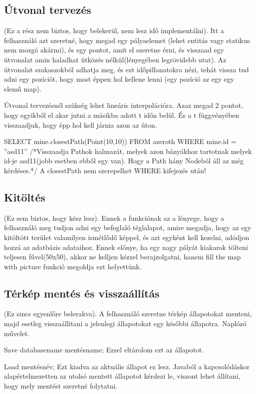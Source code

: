 \subsection{Útvonal tervezés}

(Ez a rész nem biztos, hogy belekerül, nem lesz idő implementálni). Itt a felhasználó azt szeretné, hogy megad egy pályaelemet (lehet entitás vagy statikus nem mozgó akármi), és egy pontot, amit el szeretne érni, és visszaad egy útvonalat amin haladhat ütközés nélkül(lényegében legrövidebb utat). Az útvonalat szakaszokból adhatja meg, és ezt időpillanatokra nézi, tehát vissza tud adni egy pozíciót, hogy most éppen hol kellene lenni (egy pozíció az egy egy elemű map).

Útvonal tervezésnél szükség lehet lineáris interpolációra. Azaz megad 2 pontot, hogy egyikből el akar jutni a másikba adott t időn belül. És a t függvényében visszaadjuk, hogy épp hol kell járnia azon az úton.

SELECT mine.closestPath(Point(10,10)) FROM azeroth WHERE mine.id = ”asd11”
/*Visszaadja Pathok halmazát, melyek azon bányákhoz tartotnak melyek id-je asd11(jobb esetben ebből egy van). Hogy a Path hány Nodeból áll az még kérdéses.*/
A closestPath nem szerepelhet WHERE kifejezés után!

\subsection{Kitöltés}

(Ez sem biztos, hogy kész lesz).  Ennek a funkciónak az a lényege, hogy a felhasználó meg tudjon adni egy befoglaló téglalapot, amire megadja, hogy az egy kitöltött terület valamilyen ismétlődő képpel, és azt egyként kell kezelni, adódjon hozzá az adatbázis adataihoz. Ennek előnye, ha egy nagy pályát kiakarok tölteni teljesen fűvel(50x50), akkor ne kelljen kézzel berajzolgatni, hanem fill the map with picture funkció megoldja ezt helyettünk.

\subsection{Térkép mentés és visszaállítás}

(Ez sincs egyenlőre belerakva). A felhasználó szeretne térkép állapotokat menteni, majd esetleg visszaállítani a jelenlegi állapotokat egy későbbi állapotra. Naplózó művelet.

Save databasename mentésname;
Ezzel eltárolom ezt az állapotot.

Load mentésnév;
Ezt kiadva az aktuális állapot ez lesz. Javaból a kapcsolódáskor alapértelmezetten az utolsó mentett állapotot kérdezi le, viszont lehet állítani, hogy mely mentést szeretné folytatni.

